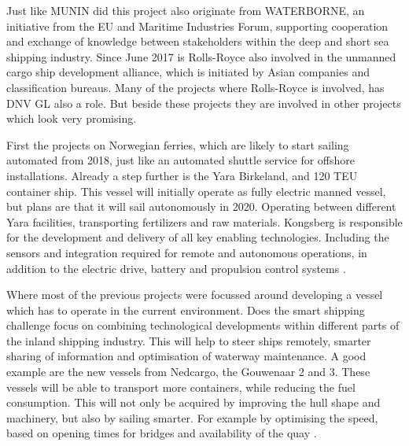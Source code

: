 Just like MUNIN did this project also originate from WATERBORNE, an initiative from the EU and Maritime Industries Forum, supporting cooperation and exchange of knowledge between stakeholders within the deep and short sea shipping industry. Since June 2017 is Rolls-Royce also involved in the unmanned cargo ship development alliance, which is initiated by Asian companies and classification bureaus. Many of the projects where Rolls-Royce is involved, has DNV GL also a role. But beside these projects they are involved in other projects which look very promising.

First the projects on Norwegian ferries, which are likely to start sailing automated from 2018, just like an automated shuttle service for offshore installations. 
Already a step further is the Yara Birkeland, and 120 \ac{TEU} container ship. This vessel will initially operate as fully electric manned vessel, but plans are that it will sail autonomously in 2020. Operating between different Yara facilities, transporting fertilizers and raw materials. 
Kongsberg is responsible for the development and delivery of all key enabling technologies. Including the sensors and integration required for remote and autonomous operations, in addition to the electric drive, battery and propulsion control systems \cite{Sames2017}.

Where most of the previous projects were focussed around developing a vessel which has to operate in the current environment. Does the smart shipping challenge focus on combining technological developments within different parts of the inland shipping industry. This will help to steer ships remotely, smarter sharing of information and optimisation of waterway maintenance.
A good example are the new vessels from Nedcargo, the Gouwenaar 2 and 3. These vessels will be able to transport more containers, while reducing the fuel consumption. This will not only be acquired by improving the hull shape and machinery, but also by sailing smarter. For example by optimising the speed, based on opening times for bridges and availability of the quay \cite{SMASH2017}. 

